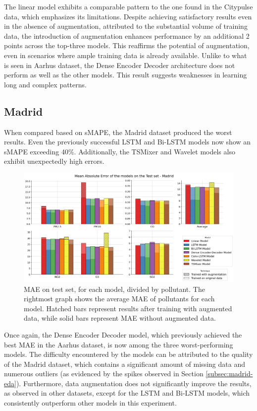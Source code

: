 The linear model exhibits a comparable pattern to the one found in the Citypulse data, which emphasizes its limitations. Despite achieving satisfactory results even in the absence of augmentation, attributed to the substantial volume of training data, the introduction of augmentation enhances performance by an additional 2 points across the top-three models. This reaffirms the potential of augmentation, even in scenarios where ample training data is already available.
Unlike to what is seen in Aarhus dataset, the Dense Encoder Decoder architecture does not perform as well as the other models. This result suggests weaknesses in learning long and complex patterns.

\subsection{Madrid}

When compared based on sMAPE, the Madrid dataset produced the worst results. Even the previously successful LSTM and Bi-LSTM models now show an sMAPE exceeding 40\%. Additionally, the TSMixer and Wavelet models also exhibit unexpectedly high errors.

\begin{figure}[h]
    \centering
    \includegraphics[width=1\linewidth]{images/Madrid_results.png}
    \caption{MAE on test set, for each model, divided by pollutant. The rightmost graph shows the average MAE of pollutants for each model. Hatched bars represent results after training with augmented data, while solid bars represent MAE without augmented data.}
    \label{fig:madrid_results}
\end{figure}

Once again, the Dense Encoder Decoder model, which previously achieved the best MAE in the Aarhus dataset, is now among the three worst-performing models.
The difficulty encountered by the models can be attributed to the quality of the Madrid dataset, which contains a significant amount of missing data and numerous outliers (as evidenced by the spikes observed in Section \ref{subsec:madrid-eda}). Furthermore, data augmentation does not significantly improve the results, as observed in other datasets, except for the LSTM and Bi-LSTM models, which consistently outperform other models in this experiment.

